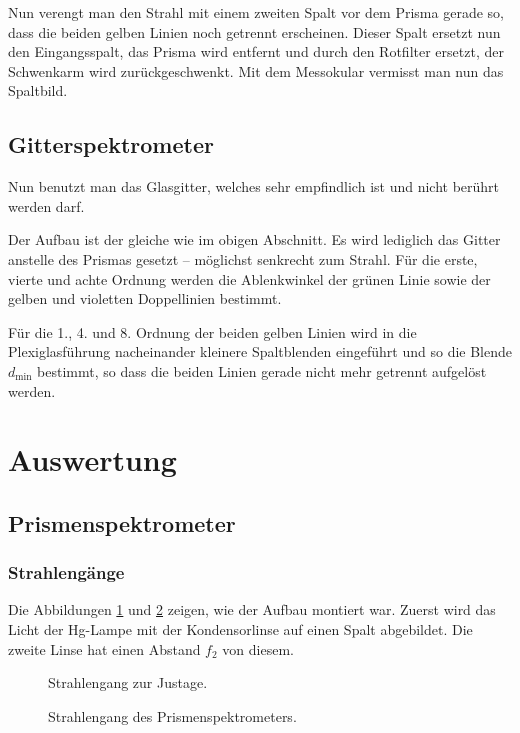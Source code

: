 \documentclass[12pt,a4paper,titlepage,headinclude,bibtotoc]{scrartcl}
\begin{document}
Nun verengt man den Strahl mit einem zweiten Spalt vor dem Prisma gerade so, dass die beiden gelben Linien noch getrennt erscheinen.
Dieser Spalt ersetzt nun den Eingangsspalt, das Prisma wird entfernt und durch den Rotfilter ersetzt, der Schwenkarm wird zurückgeschwenkt.
Mit dem Messokular vermisst man nun das Spaltbild.

\subsection{Gitterspektrometer}
Nun benutzt man das Glasgitter, welches sehr empfindlich ist und nicht berührt werden darf.

Der Aufbau ist der gleiche wie im obigen Abschnitt.
Es wird lediglich das Gitter anstelle des Prismas gesetzt -- möglichst senkrecht zum Strahl.
Für die erste, vierte und achte Ordnung werden die Ablenkwinkel der grünen Linie sowie der gelben und violetten Doppellinien bestimmt.

Für die 1., 4. und 8. Ordnung der beiden gelben Linien wird in die Plexiglasführung nacheinander kleinere Spaltblenden eingeführt und so die Blende $d_\text{min}$ bestimmt, so dass die beiden Linien gerade nicht mehr getrennt aufgelöst werden.

\section{Auswertung}
\label{sec:auswertung}

\subsection{Prismenspektrometer}
\subsubsection{Strahlengänge}
Die Abbildungen \ref{fig:Strahlengang1} und \ref{fig:Strahlengang2} zeigen, wie der Aufbau montiert war.
Zuerst wird das Licht der Hg-Lampe mit der Kondensorlinse auf einen Spalt abgebildet.
Die zweite Linse hat einen Abstand $f_2$ von diesem.
\begin{figure}[!htb]
	\def\svgwidth{0.8\linewidth}	
	
	\caption{Strahlengang zur Justage. \protect \footnotemark}
	\label{fig:Strahlengang1}	
\end{figure}

\begin{figure}[!htb]
	\def\svgwidth{0.8\linewidth}
	
	\caption{Strahlengang des Prismenspektrometers.  \protect \footnotemark[1]}
	\label{fig:Strahlengang2}
\end{figure}
\end{document}
